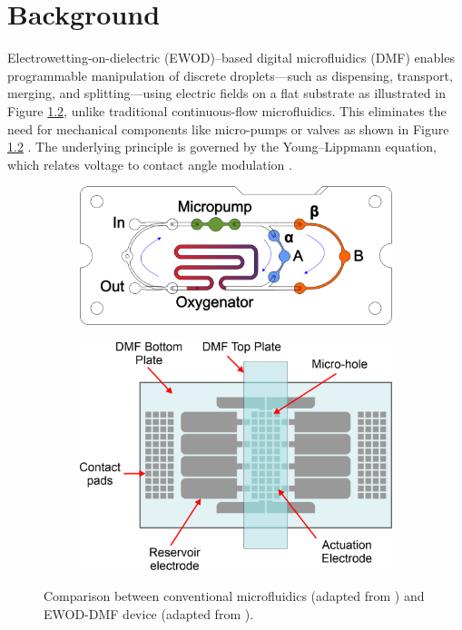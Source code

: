 \documentclass{Notes}
\begin{document}
\tableofcontents

\chapter{Background}

Electrowetting-on-dielectric (EWOD)–based digital microfluidics (DMF) enables programmable manipulation of discrete droplets—such as dispensing, transport, merging, and splitting—using electric fields on a flat substrate as illustrated in Figure \ref{dmf_example}, unlike traditional continuous-flow microfluidics. This eliminates the need for mechanical components like micro-pumps or valves as shown in Figure \ref{dmf_example} . The underlying principle is governed by the Young–Lippmann equation, which relates voltage to contact angle modulation \cite{kimPCBbasedDigitalMicrofluidic2024}.

\begin{figure}[h!]
\centering
\begin{subfigure}[b]{0.49\linewidth}
\centering
\includegraphics[width=\linewidth]{ExampleMicrofluidics.png}
\caption{}
\label{microfluidics_example}
\end{subfigure}
\begin{subfigure}[b]{0.49\linewidth}
\centering
\includegraphics[width=\linewidth]{ExampleDMF.png}
\caption{}
\label{dmf_example}
\end{subfigure}
\caption{Comparison between  conventional microfluidics (adapted from \cite{busekDesignCharacterizationModeling2016}) and  EWOD-DMF device (adapted from \cite{pengAllinOneDigitalMicrofluidics2023}).}
\label{microfluidics_vs_dmf}
\end{figure}
\end{document}
